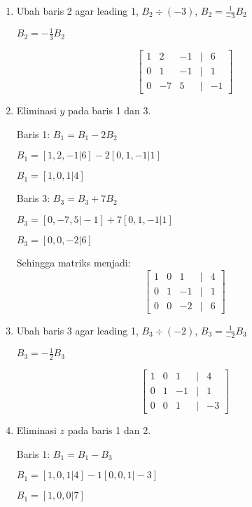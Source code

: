 \documentclass{article}
\begin{document}
\begin{enumerate}
    \item Ubah baris 2 agar leading 1, \(B_2 \div (-3)\), \(B_2 = \frac{1}{-3}B_2\)

    \(B_2 = - \frac{1}{3}B_2\)

    \[
    \begin{bmatrix}
    1 & 2 & -1 & \vert & 6 \\
    0 & 1 & -1 & \vert & 1 \\
    0 & -7 & 5 & \vert & -1
    \end{bmatrix}
    \]

    \item Eliminasi $y$ pada baris 1 dan 3.

    Baris 1: \(B_1 = B_1 - 2B_2\)

    \(B_1 = [1, 2, -1 \vert 6] - 2[0, 1, -1 \vert 1]\)

    \(B_1 = [1, 0, 1 \vert 4]\)

    Baris 3: \(B_3 = B_3 + 7B_2\)

    \(B_3 = [0, -7, 5 \vert -1] + 7[0, 1, -1 \vert 1]\)

    \(B_3 = [0, 0, -2 \vert 6]\)

    \vspace{1em}

    Sehingga matriks menjadi:
    \[
    \begin{bmatrix}
    1 & 0 & 1 & \vert & 4 \\
    0 & 1 & -1 & \vert & 1 \\
    0 & 0 & -2 & \vert & 6
    \end{bmatrix}
    \]

    \item Ubah baris 3 agar leading 1, \(B_3 \div (-2)\), \(B_3 = \frac{1}{-2}B_3\)

    \(B_3 = - \frac{1}{2}B_3\)

    \[
    \begin{bmatrix}
    1 & 0 & 1 & \vert & 4 \\
    0 & 1 & -1 & \vert & 1 \\
    0 & 0 & 1 & \vert & -3
    \end{bmatrix}
    \]

    \item Eliminasi $z$ pada baris 1 dan 2.
    
    Baris 1: \(B_1 = B_1 - B_3\)

    \(B_1 = [1, 0, 1 \vert 4] - 1[0, 0, 1 \vert -3]\)

    \(B_1 = [1, 0, 0 \vert 7]\)


\end{enumerate}
\end{document}
